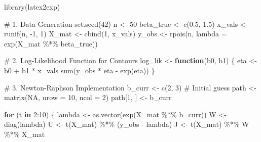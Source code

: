 \documentclass[
  letterpaper,
  DIV=11,
  numbers=noendperiod]{scrreprt}
\newenvironment{Shaded}{\begin{snugshade}}{\end{snugshade}}
\newcommand{\AttributeTok}[1]{\textcolor[rgb]{0.40,0.45,0.13}{#1}}
\newcommand{\CommentTok}[1]{\textcolor[rgb]{0.37,0.37,0.37}{#1}}
\newcommand{\ConstantTok}[1]{\textcolor[rgb]{0.56,0.35,0.01}{#1}}
\newcommand{\ControlFlowTok}[1]{\textcolor[rgb]{0.00,0.23,0.31}{\textbf{#1}}}
\newcommand{\DecValTok}[1]{\textcolor[rgb]{0.68,0.00,0.00}{#1}}
\newcommand{\FloatTok}[1]{\textcolor[rgb]{0.68,0.00,0.00}{#1}}
\newcommand{\FunctionTok}[1]{\textcolor[rgb]{0.28,0.35,0.67}{#1}}
\newcommand{\NormalTok}[1]{\textcolor[rgb]{0.00,0.23,0.31}{#1}}
\newcommand{\OtherTok}[1]{\textcolor[rgb]{0.00,0.23,0.31}{#1}}
\newcommand{\SpecialCharTok}[1]{\textcolor[rgb]{0.37,0.37,0.37}{#1}}
\renewcommand{\[}{\begin{equation}}
\renewcommand{\]}{\end{equation}}
\theoremstyle{definition}
\theoremstyle{plain}
\theoremstyle{plain}
\theoremstyle{plain}
\theoremstyle{definition}
\theoremstyle{plain}
\theoremstyle{remark}
\begin{document}
\begin{Shaded}
\begin{Highlighting}[]
\FunctionTok{library}\NormalTok{(latex2exp)}

\CommentTok{\# 1. Data Generation}
\FunctionTok{set.seed}\NormalTok{(}\DecValTok{42}\NormalTok{)}
\NormalTok{n }\OtherTok{\textless{}{-}} \DecValTok{50}
\NormalTok{beta\_true }\OtherTok{\textless{}{-}} \FunctionTok{c}\NormalTok{(}\FloatTok{0.5}\NormalTok{, }\FloatTok{1.5}\NormalTok{)}
\NormalTok{x\_vals }\OtherTok{\textless{}{-}} \FunctionTok{runif}\NormalTok{(n, }\SpecialCharTok{{-}}\DecValTok{1}\NormalTok{, }\DecValTok{1}\NormalTok{)}
\NormalTok{X\_mat }\OtherTok{\textless{}{-}} \FunctionTok{cbind}\NormalTok{(}\DecValTok{1}\NormalTok{, x\_vals)}
\NormalTok{y\_obs }\OtherTok{\textless{}{-}} \FunctionTok{rpois}\NormalTok{(n, }\AttributeTok{lambda =} \FunctionTok{exp}\NormalTok{(X\_mat }\SpecialCharTok{\%*\%}\NormalTok{ beta\_true))}

\CommentTok{\# 2. Log{-}Likelihood Function for Contours}
\NormalTok{log\_lik }\OtherTok{\textless{}{-}} \ControlFlowTok{function}\NormalTok{(b0, b1) \{}
\NormalTok{  eta }\OtherTok{\textless{}{-}}\NormalTok{ b0 }\SpecialCharTok{+}\NormalTok{ b1 }\SpecialCharTok{*}\NormalTok{ x\_vals}
  \FunctionTok{sum}\NormalTok{(y\_obs }\SpecialCharTok{*}\NormalTok{ eta }\SpecialCharTok{{-}} \FunctionTok{exp}\NormalTok{(eta))}
\NormalTok{\}}

\CommentTok{\# 3. Newton{-}Raphson Implementation}
\NormalTok{b\_curr }\OtherTok{\textless{}{-}} \FunctionTok{c}\NormalTok{(}\DecValTok{2}\NormalTok{, }\DecValTok{3}\NormalTok{) }\CommentTok{\# Initial guess}
\NormalTok{path }\OtherTok{\textless{}{-}} \FunctionTok{matrix}\NormalTok{(}\ConstantTok{NA}\NormalTok{, }\AttributeTok{nrow =} \DecValTok{10}\NormalTok{, }\AttributeTok{ncol =} \DecValTok{2}\NormalTok{)}
\NormalTok{path[}\DecValTok{1}\NormalTok{, ] }\OtherTok{\textless{}{-}}\NormalTok{ b\_curr}

\ControlFlowTok{for}\NormalTok{ (t }\ControlFlowTok{in} \DecValTok{2}\SpecialCharTok{:}\DecValTok{10}\NormalTok{) \{}
\NormalTok{  lambda }\OtherTok{\textless{}{-}} \FunctionTok{as.vector}\NormalTok{(}\FunctionTok{exp}\NormalTok{(X\_mat }\SpecialCharTok{\%*\%}\NormalTok{ b\_curr))}
\NormalTok{  W }\OtherTok{\textless{}{-}} \FunctionTok{diag}\NormalTok{(lambda)}
\NormalTok{  U }\OtherTok{\textless{}{-}} \FunctionTok{t}\NormalTok{(X\_mat) }\SpecialCharTok{\%*\%}\NormalTok{ (y\_obs }\SpecialCharTok{{-}}\NormalTok{ lambda)}
\NormalTok{  J }\OtherTok{\textless{}{-}} \FunctionTok{t}\NormalTok{(X\_mat) }\SpecialCharTok{\%*\%}\NormalTok{ W }\SpecialCharTok{\%*\%}\NormalTok{ X\_mat}
   

\end{Highlighting}
\end{Shaded}
\end{document}

